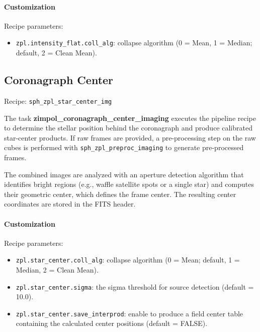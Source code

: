 \paragraph{Customization}

Recipe parameters:

\begin{itemize}
\item \texttt{zpl.intensity\_flat.coll\_alg}: collapse algorithm
(0 = Mean, 1 = Median; default, 2 = Clean Mean).
\end{itemize}


\subsection{Coronagraph Center}

Recipe: \texttt{sph\_zpl\_star\_center\_img}

The task \textbf{zimpol\_coronagraph\_center\_imaging} executes the pipeline recipe to
determine the stellar position behind the coronagraph and produce calibrated star-center products.
If raw frames are provided, a pre-processing step on the raw cubes is performed with \texttt{sph\_zpl\_preproc\_imaging} to generate pre-processed frames.

The combined images are analyzed with an aperture detection algorithm that identifies bright regions
(e.g., waffle satellite spots or a single star) and computes their geometric center, which defines the frame center.
The resulting center coordinates are stored in the FITS header.

\paragraph{Customization}

Recipe parameters:
\begin{itemize}
\item \texttt{zpl.star\_center.coll\_alg}: collapse algorithm
(0 = Mean; default, 1 = Median, 2 = Clean Mean).
\item \texttt{zpl.star\_center.sigma}: the sigma threshold for source detection
(default = 10.0).
\item \texttt{zpl.star\_center.save\_interprod}: enable to produce
a field center table containing the calculated center positions
(default = FALSE).
\end{itemize}


